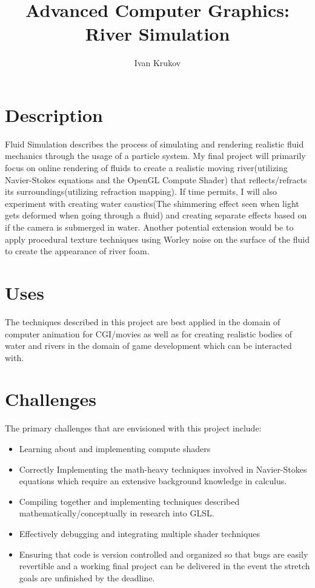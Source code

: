 \documentclass[11pt]{article}
\begin{document}
\author{Ivan Krukov}
\title{Advanced Computer Graphics: River Simulation}
\maketitle

\medskip

\section{Description} 

Fluid Simulation describes the process of simulating and rendering realistic fluid mechanics through the usage of a particle system. My final project will primarily focus on online rendering of fluids to create a realistic moving river(utilizing Navier-Stokes equations and the OpenGL Compute Shader) that reflects/refracts its surroundings(utilizing refraction mapping). If time permits, I will also experiment with creating water caustics(The shimmering effect seen when light gets deformed when going through a fluid) and creating separate effects based on if the camera is submerged in water. Another potential extension would be to apply procedural texture techniques using Worley noise on the surface of the fluid to create the appearance of river foam. 

\section{Uses} 

The techniques described in this project are best applied in the domain of computer animation for CGI/movies as well as for creating realistic bodies of water and rivers in the domain of game development which can be interacted with. 


\section{Challenges}

The primary challenges that are envisioned with this project include:

\begin{itemize}
	\item Learning about and implementing compute shaders

	\item Correctly Implementing the math-heavy techniques involved in Navier-Stokes equations which require an extensive background knowledge in calculus.

	\item Compiling together and implementing techniques described mathematically/conceptually in research into GLSL.

	\item Effectively debugging and integrating multiple shader techniques

	\item Ensuring that code is version controlled and organized so that bugs are easily revertible and a working final project can be delivered in the event the stretch goals are unfinished by the deadline.

\end{itemize}
\end{document}
